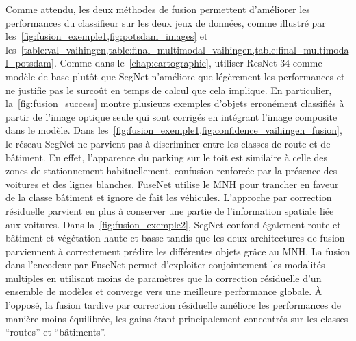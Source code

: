 Comme attendu, les deux méthodes de fusion permettent d'améliorer les performances du classifieur sur les deux jeux de données, comme illustré par les~\cref{fig:fusion_exemple1,fig:potsdam_images} et les~\cref{table:val_vaihingen,table:final_multimodal_vaihingen,table:final_multimodal_potsdam}. Comme dans le~\cref{chap:cartographie}, utiliser ResNet-34 comme modèle de base plutôt que SegNet n'améliore que légèrement les performances et ne justifie pas le surcoût en temps de calcul que cela implique. En particulier, la~\cref{fig:fusion_success} montre plusieurs exemples d'objets erronément classifiés à partir de l'image optique seule qui sont corrigés en intégrant l'image composite dans le modèle. Dans les~\cref{fig:fusion_exemple1,fig:confidence_vaihingen_fusion}, le réseau SegNet ne parvient pas à discriminer entre les classes de route et de bâtiment. En effet, l'apparence du parking sur le toit est similaire à celle des zones de stationnement habituellement, confusion renforcée par la présence des voitures et des lignes blanches. FuseNet utilise le \gls{MNH} pour trancher en faveur de la classe bâtiment et ignore de fait les véhicules. L'approche par correction résiduelle parvient en plus à conserver une partie de l'information spatiale liée aux voitures. Dans la~\cref{fig:fusion_exemple2}, SegNet confond également route et bâtiment et végétation haute et basse tandis que les deux architectures de fusion parviennent à correctement prédire les différentes objets grâce au \gls{MNH}.
La fusion dans l'encodeur par FuseNet permet d'exploiter conjointement les modalités multiples en utilisant moins de paramètres que la correction résiduelle d'un ensemble de modèles et converge vers une meilleure performance globale. À l'opposé, la fusion tardive par correction résiduelle améliore les performances de manière moins équilibrée, les gains étant principalement concentrés sur les classes ``routes'' et ``bâtiments''.

